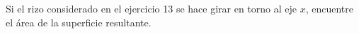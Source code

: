 \item Si el rizo considerado en el ejercicio 13 se hace girar en torno al eje $x$, encuentre el área de la superficie resultante.
